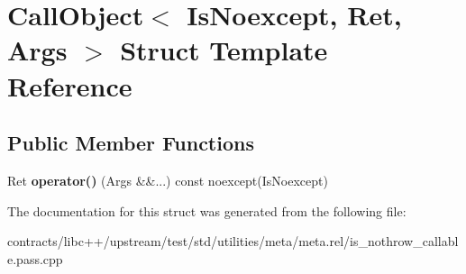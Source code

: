 \hypertarget{struct_call_object}{}\section{Call\+Object$<$ Is\+Noexcept, Ret, Args $>$ Struct Template Reference}
\label{struct_call_object}
\subsection*{Public Member Functions}
\begin{DoxyCompactItemize}
\item 
\mbox{\label{struct_call_object_ae200c846cc5a99a6c66db41f7ac0bdc9}} 
Ret {\bfseries operator()} (Args \&\&...) const noexcept(Is\+Noexcept)
\end{DoxyCompactItemize}


The documentation for this struct was generated from the following file\+:\begin{DoxyCompactItemize}
\item 
contracts/libc++/upstream/test/std/utilities/meta/meta.\+rel/is\+\_\+nothrow\+\_\+callable.\+pass.\+cpp\end{DoxyCompactItemize}
